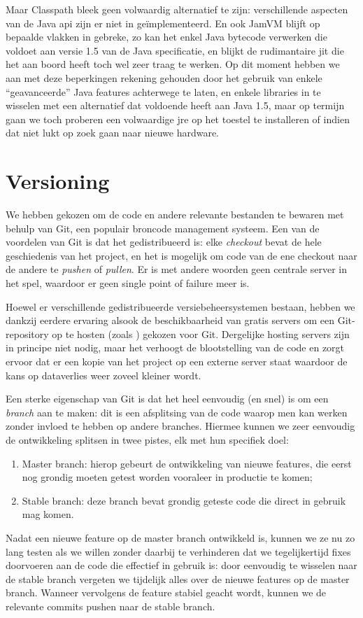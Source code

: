 Maar Classpath bleek geen volwaardig alternatief te zijn: verschillende aspecten van de Java \ac{api} zijn er niet in geïmplementeerd. En ook JamVM blijft op bepaalde vlakken in gebreke, zo kan het enkel Java bytecode verwerken die voldoet aan versie 1.5 van de Java specificatie, en blijkt de rudimantaire \ac{jit} die het aan boord heeft toch wel zeer traag te werken. Op dit moment hebben we aan met deze beperkingen rekening gehouden door het gebruik van enkele ``geavanceerde'' Java features achterwege te laten, en enkele libraries in te wisselen met een alternatief dat voldoende heeft aan Java 1.5, maar op termijn gaan we toch proberen een volwaardige \ac{jre} op het toestel te installeren of indien dat niet lukt op zoek gaan naar nieuwe hardware.

\section{Versioning}
\label{server:deployment:versioning}

We hebben gekozen om de code en andere relevante bestanden te bewaren met behulp van Git, een populair broncode management systeem. Een van de voordelen van Git is dat het gedistribueerd is: elke \emph{checkout} bevat de hele geschiedenis van het project, en het is mogelijk om code van de ene checkout naar de andere te \emph{pushen} of \emph{pullen}. Er is met andere woorden geen centrale server in het spel, waardoor er geen single point of failure meer is.

Hoewel er verschillende gedistribueerde versiebeheersystemen bestaan, hebben we dankzij eerdere ervaring alsook de beschikbaarheid van gratis servers om een Git-repository op te hosten (zoals ) gekozen voor Git. Dergelijke hosting servers zijn in principe niet nodig, maar het verhoogt de blootstelling van de code en zorgt ervoor dat er een kopie van het project op een externe server staat waardoor de kans op dataverlies weer zoveel kleiner wordt.

Een sterke eigenschap van Git is dat het heel eenvoudig (en snel) is om een \emph{branch} aan te maken: dit is een afsplitsing van de code waarop men kan werken zonder invloed te hebben op andere branches. Hiermee kunnen we zeer eenvoudig de ontwikkeling splitsen in twee pistes, elk met hun specifiek doel:
\begin{enumerate}
  \item Master branch: hierop gebeurt de ontwikkeling van nieuwe features, die eerst nog grondig moeten getest worden vooraleer in productie te komen;
  \item Stable branch: deze branch bevat grondig geteste code die direct in gebruik mag komen.
\end{enumerate}
Nadat een nieuwe feature op de master branch ontwikkeld is, kunnen we ze nu zo lang testen als we willen zonder daarbij te verhinderen dat we tegelijkertijd fixes doorvoeren aan de code die effectief in gebruik is: door eenvoudig te wisselen naar de stable branch vergeten we tijdelijk alles over de nieuwe features op de master branch. Wanneer vervolgens de feature stabiel geacht wordt, kunnen we de relevante commits pushen naar de stable branch.

